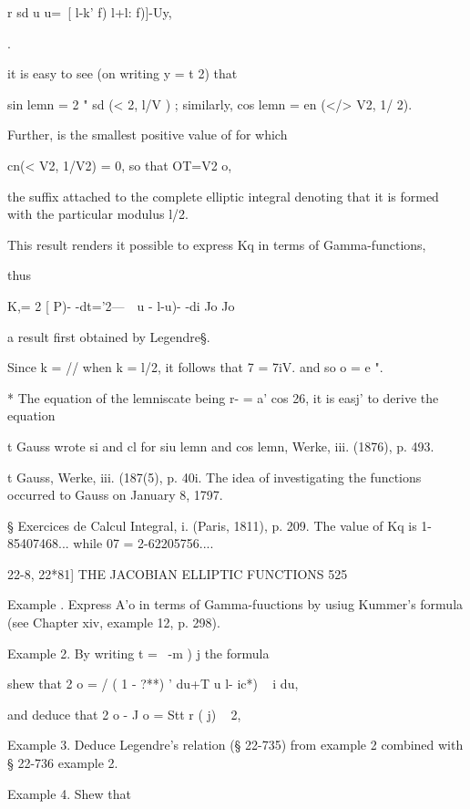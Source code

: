 r sd u u=\ [ l-k' f) l+l: f)]-Uy,

.

it is easy to see (on writing y = t \/2) that

sin lemn = 2 " sd (< \/2, l/V ) ; similarly, cos lemn = en (</> V2, 1/
2).

Further, is the smallest positive value of for which

cn(< V2, 1/V2) = 0, so that OT=V2 o,

the suffix attached to the complete elliptic integral denoting that it
is formed with the particular modulus l/\/2.

This result renders it possible to express Kq in terms of
Gamma-functions,



thus



K,= 2 [ P)- -dt='2---\ \ u - l-u)- -di Jo Jo



a result first obtained by Legendre§.

Since k = // when k = l/\/2, it follows that 7 = 7iV. and so o = e ".

* The equation of the lemniscate being r- = a' cos 26, it is easj' to
derive the equation


t Gauss wrote si and cl for siu lemn and cos lemn, Werke, iii. (1876),
p. 493.

t Gauss, Werke, iii. (187(5), p. 40i. The idea of investigating the
functions occurred to Gauss on January 8, 1797.

§ Exercices de Calcul Integral, i. (Paris, 1811), p. 209. The value of
Kq is 1-85407468... while 07 = 2-62205756....



22-8, 22*81] THE JACOBIAN ELLIPTIC FUNCTIONS 525

Example . Express A'o in terms of Gamma-fuuctions by usiug Kummer's
formula (see Chapter xiv, example 12, p. 298).

Example 2. By writing t = \ -m ) j the formula

shew that 2 o = / ( 1 - ?**) ' du+T u l- ic*) ~ i du,

and deduce that 2 o - J o = Stt r ( j) ~ 2,

Example 3. Deduce Legendre's relation (§ 22-735) from example 2
combined with § 22-736 example 2.

Example 4. Shew that


